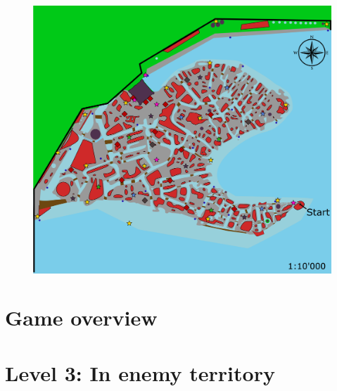\documentclass[12pt]{report}
\begin{document}
\vspace*{20pt}



\begin{figure}[H]
  \centering
  \includegraphics[width=\textwidth]{Images/Maps/dynamiaCover}
\end{figure}




\tableofcontents

\part{Game overview}











\part{Level 3: In enemy territory}




\end{document}

